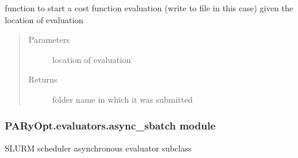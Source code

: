 \documentclass[letterpaper,12pt,english]{sphinxmanual}
\begin{document}
\begin{fulllineitems}
\begin{fulllineitems}
\label{\detokenize{PARyOpt.evaluators:PARyOpt.evaluators.async_parse_result_local.AsyncLocalParseResultEvaluator.start}}
\sphinxAtStartPar
function to start a cost function evaluation (write to file in this case) given the location         of evaluation
\begin{quote}\begin{description}
\item[{Parameters}] \leavevmode
\sphinxAtStartPar
{} \textendash{} location of evaluation

\item[{Returns}] \leavevmode
\sphinxAtStartPar
folder name in which it was submitted

\end{description}\end{quote}

\end{fulllineitems}


\end{fulllineitems}



\subsubsection{PARyOpt.evaluators.async\_sbatch module}
\label{\detokenize{PARyOpt.evaluators:module-PARyOpt.evaluators.async_sbatch}}\label{\detokenize{PARyOpt.evaluators:paryopt-evaluators-async-sbatch-module}}
\sphinxAtStartPar
SLURM scheduler asynchronous evaluator sub\sphinxhyphen{}class
\end{document}

